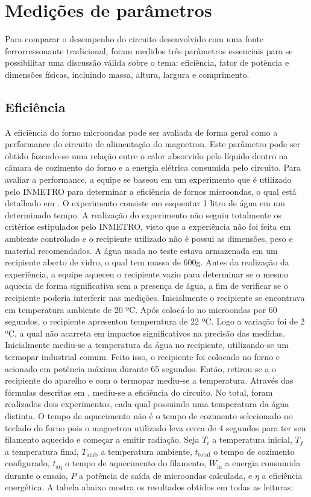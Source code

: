 \section{Medições de parâmetros}
\label{sec:mesaures}
Para comparar o desempenho do circuito desenvolvido com uma fonte ferrorressonante tradicional, foram medidos três parâmetros essenciais para se possibilitar uma discussão válida sobre o tema: eficiência, fator de potência e dimensões físicas, incluindo massa, altura, largura e comprimento. 

\subsection{Eficiência}
A eficiência do forno microondas pode ser avaliada de forma geral como a performance do circuito de alimentação do magnetron. Este parâmetro pode ser obtido fazendo-se uma relação entre o calor absorvido pelo líquido dentro na câmara de cozimento do forno e a energia elétrica consumida pelo circuito.
Para avaliar a performance, a equipe se baseou em um experimento que é utilizado pelo INMETRO para determinar a eficiência de fornos microondas, o qual está detalhado em . O experimento consiste em esquentar 1 litro de água em um determinado tempo. A realização do experimento não seguiu totalmente os critérios estipulados pelo INMETRO, visto que a experiência não foi feita em ambiente controlado e o recipiente utilizado não é possui as dimensões, peso e material recomendados. A água usada no teste estava armazenada em um recipiente aberto de vidro, o qual tem massa de 600g. Antes da realização da experiência, a equipe aqueceu o recipiente vazio para determinar se o mesmo aquecia de forma significativa sem a presença de água, a fim de verificar se o recipiente poderia interferir nas medições. Inicialmente o recipiente se encontrava em temperatura ambiente de 20 ºC. Após colocá-lo no microondas por 60 segundos, o recipiente apresentou temperatura de 22 ºC. Logo a variação foi de 2 ºC, a qual não acarreta em impactos significativos na precisão das medidas.
Inicialmente mediu-se a temperatura da água no recipiente, utilizando-se um termopar industrial comum. Feito isso, o recipiente foi colocado no forno e acionado em potência máxima durante 65 segundos. Então, retirou-se a o recipiente do aparelho e com o termopar mediu-se a temperatura. Através das fórmulas descritas em , mediu-se a eficiência do circuito. No total, foram realizados dois experimentos, cada qual possuindo uma temperatura da água distinta. O tempo de aquecimento não é o tempo de cozimento selecionado no teclado do forno pois o magnetron utilizado leva cerca de 4 segundos para ter seu filamento aquecido e começar a emitir radiação. Seja $T_i$ a temperatura inicial, $T_f$ a temperatura final, $T_\mathrm{amb}$ a temperatura ambiente, $t_\mathrm{total}$ o tempo de cozimento configurado, $t_\mathrm{aq}$  o tempo de aquecimento do filamento,  $W_\mathrm{in}$ a energia consumida durante o ensaio, $P$ a potência de saída de microondas calculada, e $\eta$ a eficiência energética. A tabela abaixo mostra os resultados obtidos em todas as leituras:
